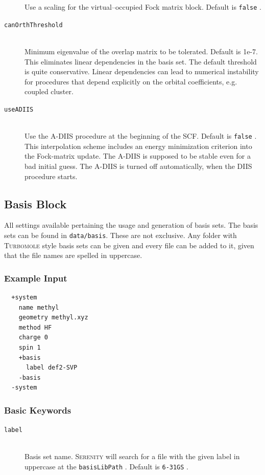 \documentclass[bibliography=totocnumbered,a4paper,10pt,oneside]{scrbook}
\newcommand{
\serenity}{\textsc{Serenity}\xspace}
\newcommand{\ttt}[1]{%
  \begingroup\setlength{\fboxsep}{1pt}%
  \colorbox{serenity-green!30}{\texttt{\hspace*{2pt}\vphantom{(g}#1\hspace*{2pt}}}%
  \endgroup
}
\begin{document}
\begin{description}
    Use a scaling for the virtual--occupied Fock matrix block. Default is \ttt{false}.
    \item [\texttt{canOrthThreshold}]\hfill \\
    Minimum eigenvalue of the overlap matrix to be tolerated. Default is 1e-7. This eliminates linear dependencies
    in the basis set. The default threshold is quite conservative. Linear dependencies can lead to numerical instability
    for procedures that depend explicitly on the orbital coefficients, e.g. coupled cluster.
    \item [\texttt{useADIIS}]\hfill \\
    Use the A-DIIS\cite{hu2010} procedure at the beginning of the SCF. Default is \ttt{false}. This interpolation scheme
    includes an energy minimization criterion into the Fock-matrix update. The A-DIIS is supposed to be stable even for a
    bad initial guess. The A-DIIS is turned off automatically, when the DIIS procedure starts.
 \end{description}

\subsection{Basis Block}\label{sec:system:basis}
All settings available pertaining the usage and generation of basis sets.
The basis sets can be found in \texttt{data/basis}. These are not exclusive. Any folder with \textsc{Turbomole}
style basis sets can be given and every file can be added to it, given that the file names are spelled in
uppercase.

\subsubsection{Example Input}
\begin{lstlisting}
  +system
    name methyl
    geometry methyl.xyz
    method HF
    charge 0
    spin 1
    +basis
      label def2-SVP
    -basis
  -system
 \end{lstlisting}
\subsubsection{Basic Keywords}
\begin{description}
 \item [\texttt{label}]\hfill \\
 Basis set name. \serenity will search for a file with the given label in uppercase at the \ttt{basisLibPath}. Default is \ttt{6-31GS}.

\end{description}
\end{document}
